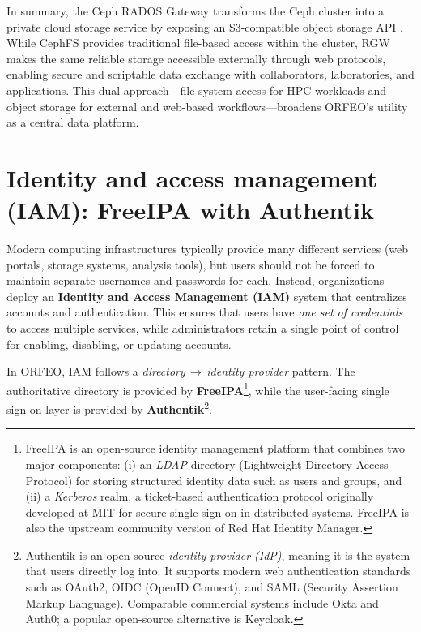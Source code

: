 \medskip

In summary, the Ceph RADOS Gateway transforms the Ceph cluster into a private 
cloud storage service by exposing an S3-compatible object storage 
API \parencite{Ceph_RGW_S3,Ceph_RGW_Overview}. While CephFS provides traditional 
file-based access within the cluster, RGW makes the same reliable storage 
accessible externally through web protocols, enabling secure and scriptable data 
exchange with collaborators, laboratories, and applications. This dual 
approach—file system access for HPC workloads and object storage for external 
and web-based workflows—broadens ORFEO’s utility as a central data platform.


\section{Identity and access management (IAM): FreeIPA with Authentik}

Modern computing infrastructures typically provide many different services 
(web portals, storage systems, analysis tools), but users should not be forced 
to maintain separate usernames and passwords for each. Instead, organizations 
deploy an \textbf{Identity and Access Management (IAM)} system that centralizes 
accounts and authentication. This ensures that users have \emph{one set of 
	credentials} to access multiple services, while administrators retain a single 
point of control for enabling, disabling, or updating accounts.

\medskip

In ORFEO, IAM follows a \emph{directory\,$\rightarrow$\,identity provider} 
pattern. The authoritative directory is provided by 
\textbf{FreeIPA}\footnote{%
	FreeIPA is an open-source identity management platform that combines two 
	major components: (i) an \emph{LDAP} directory (Lightweight Directory Access 
	Protocol) for storing structured identity data such as users and groups, and 
	(ii) a \emph{Kerberos} realm, a ticket-based authentication protocol 
	originally developed at MIT for secure single sign-on in distributed systems. 
	FreeIPA is also the upstream community version of Red Hat Identity Manager.}, 
while the user-facing single sign-on layer is provided by 
\textbf{Authentik}\footnote{%
	Authentik is an open-source \emph{identity provider (IdP)}, meaning it is the 
	system that users directly log into. It supports modern web authentication 
	standards such as OAuth2, OIDC (OpenID Connect), and SAML (Security Assertion 
	Markup Language). Comparable commercial systems include Okta and Auth0; a 
	popular open-source alternative is Keycloak.}. 

